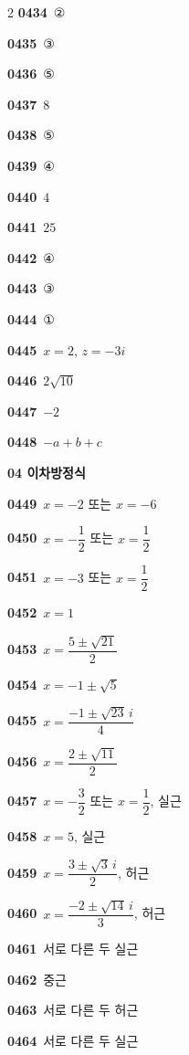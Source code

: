 \documentclass[10pt,a4paper]{article}
\begin{document}
\begin{multicols}{2}
\noindent\textbf{0434}\ ②\par
\noindent\textbf{0435}\ ③\par
\noindent\textbf{0436}\ ⑤\par
\noindent\textbf{0437}\ $8$\par
\noindent\textbf{0438}\ ⑤\par
\noindent\textbf{0439}\ ④\par
\noindent\textbf{0440}\ $4$\par
\noindent\textbf{0441}\ $25$\par
\noindent\textbf{0442}\ ④\par
\noindent\textbf{0443}\ ③\par
\noindent\textbf{0444}\ ①\par
\noindent\textbf{0445}\ $x=2$, $z=-3i$\par
\noindent\textbf{0446}\ $2\sqrt{10}$\par
\noindent\textbf{0447}\ $-2$\par
\noindent\textbf{0448}\ $-a+b+c$\par
\noindent\textbf{04 이차방정식}\par\smallskip
\noindent\textbf{0449}\ $x=-2$ 또는 $x=-6$\par
\noindent\textbf{0450}\ $x=-\dfrac{1}{2}$ 또는 $x=\dfrac{1}{2}$\par
\noindent\textbf{0451}\ $x=-3$ 또는 $x=\dfrac{1}{2}$\par
\noindent\textbf{0452}\ $x=1$\par
\noindent\textbf{0453}\ $x=\dfrac{5\pm\sqrt{21}}{2}$\par
\noindent\textbf{0454}\ $x=-1\pm\sqrt{5}$\par
\noindent\textbf{0455}\ $x=\dfrac{-1\pm\sqrt{23}\,i}{4}$\par
\noindent\textbf{0456}\ $x=\dfrac{2\pm\sqrt{11}}{2}$\par
\noindent\textbf{0457}\ $x=-\dfrac{3}{2}$ 또는 $x=\dfrac{1}{2}$, 실근\par
\noindent\textbf{0458}\ $x=5$, 실근\par
\noindent\textbf{0459}\ $x=\dfrac{3\pm\sqrt{3}\,i}{2}$, 허근\par
\noindent\textbf{0460}\ $x=\dfrac{-2\pm\sqrt{14}\,i}{3}$, 허근\par
\noindent\textbf{0461}\ 서로 다른 두 실근\par
\noindent\textbf{0462}\ 중근\par
\noindent\textbf{0463}\ 서로 다른 두 허근\par
\noindent\textbf{0464}\ 서로 다른 두 실근\par

\end{multicols}
\end{document}
